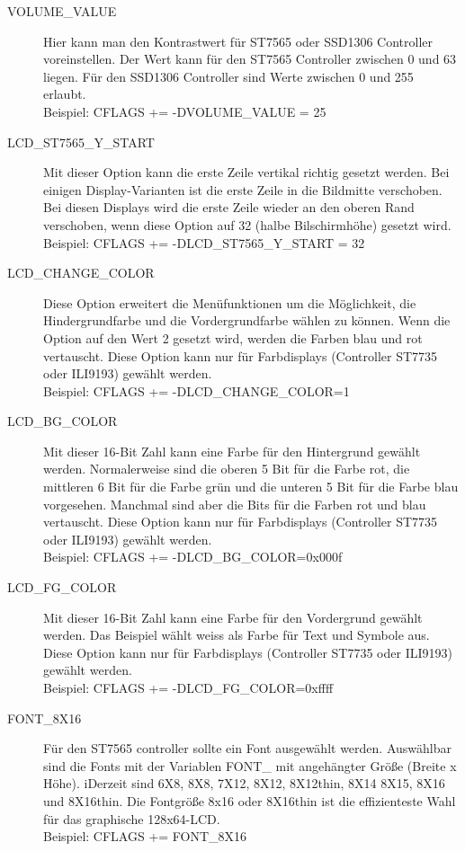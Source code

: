 \begin{description}
  \item[VOLUME\_VALUE] Hier kann man den Kontrastwert für ST7565 oder SSD1306 Controller voreinstellen.
Der Wert kann für den ST7565 Controller zwischen 0 und 63 liegen.
Für den SSD1306 Controller sind Werte zwischen 0 und 255 erlaubt.\\
Beispiel: CFLAGS += -DVOLUME\_VALUE = 25

  \item[LCD\_ST7565\_Y\_START] Mit dieser Option kann die erste Zeile vertikal richtig gesetzt werden.
Bei einigen Display-Varianten ist die erste Zeile in die Bildmitte verschoben.
Bei diesen Displays wird die erste Zeile wieder an den oberen Rand verschoben, 
wenn diese Option auf 32 (halbe Bilschirmhöhe) gesetzt wird.\\
Beispiel: CFLAGS += -DLCD\_ST7565\_Y\_START = 32

  \item[LCD\_CHANGE\_COLOR] Diese Option erweitert die Menüfunktionen um die Möglichkeit,
die Hindergrundfarbe und die Vordergrundfarbe wählen zu können. Wenn die Option auf
den Wert 2 gesetzt wird, werden die Farben blau und rot vertauscht.
Diese Option kann nur für Farbdisplays (Controller ST7735 oder ILI9193) gewählt werden.\\
Beispiel: CFLAGS += -DLCD\_CHANGE\_COLOR=1

 \item[LCD\_BG\_COLOR] Mit dieser 16-Bit Zahl kann eine Farbe für den Hintergrund gewählt werden.
Normalerweise sind die oberen 5 Bit für die Farbe rot, die mittleren 6 Bit für die Farbe grün
und die unteren 5 Bit für die Farbe blau vorgesehen. Manchmal sind aber die Bits für die Farben 
rot und blau vertauscht.
Diese Option kann nur für Farbdisplays (Controller ST7735 oder ILI9193) gewählt werden.\\
Beispiel: CFLAGS += -DLCD\_BG\_COLOR=0x000f

 \item[LCD\_FG\_COLOR] Mit dieser 16-Bit Zahl kann eine Farbe für den Vordergrund gewählt werden.
Das Beispiel wählt weiss als Farbe für Text und Symbole aus.
Diese Option kann nur für Farbdisplays (Controller ST7735 oder ILI9193) gewählt werden.\\
Beispiel: CFLAGS += -DLCD\_FG\_COLOR=0xffff

  \item[FONT\_8X16] Für den ST7565 controller sollte ein Font ausgewählt werden.
Auswählbar sind die Fonts mit der Variablen FONT\_ mit angehängter Größe (Breite x Höhe).
iDerzeit sind 6X8, 8X8, 7X12, 8X12, 8X12thin, 8X14 8X15, 8X16 und 8X16thin.
Die Fontgröße 8x16 oder 8X16thin ist die effizienteste Wahl für das graphische 128x64-LCD.\\
Beispiel: CFLAGS += FONT\_8X16


\end{description}
